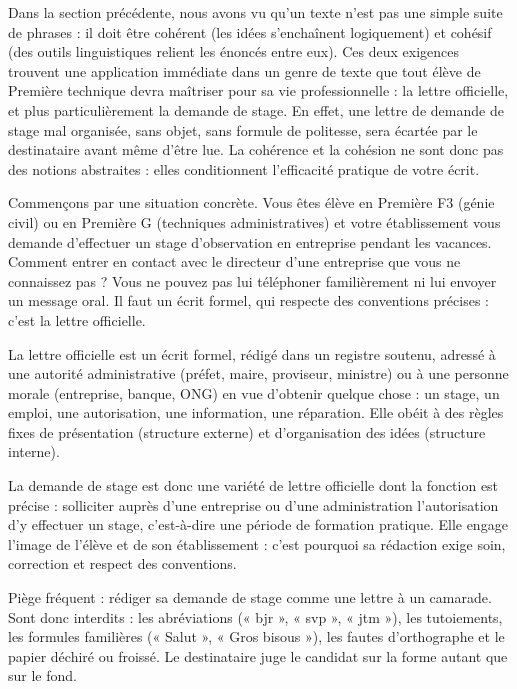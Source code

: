 \documentclass[11pt]{article}
\newcommand{\cle}[1]{{\popxbold\color{popdark}#1}}
\newcounter{popsec}
\newcounter{popsub}
\newcommand{\courssub}[1]{%
  \stepcounter{popsub}%
  \par\vspace{9pt}\noindent{\popxbold\fontsize{11.5}{13}\selectfont\color{popink}{\color{poporange}\thepopsec.\thepopsub}\hspace{6pt}#1}\par\nopagebreak\vspace{4pt}
}
\begin{document}
Dans la section précédente, nous avons vu qu'un texte n'est pas une simple suite de phrases : il doit être \cle{cohérent} (les idées s'enchaînent logiquement) et \cle{cohésif} (des outils linguistiques relient les énoncés entre eux). Ces deux exigences trouvent une application immédiate dans un genre de texte que tout élève de Première technique devra maîtriser pour sa vie professionnelle : la \cle{lettre officielle}, et plus particulièrement la \cle{demande de stage}. En effet, une lettre de demande de stage mal organisée, sans objet, sans formule de politesse, sera écartée par le destinataire avant même d'être lue. La cohérence et la cohésion ne sont donc pas des notions abstraites : elles conditionnent l'efficacité pratique de votre écrit.

\courssub{Nature et fonction de la lettre officielle}

Commençons par une situation concrète. Vous êtes élève en Première F3 (génie civil) ou en Première G (techniques administratives) et votre établissement vous demande d'effectuer un stage d'observation en entreprise pendant les vacances. Comment entrer en contact avec le directeur d'une entreprise que vous ne connaissez pas ? Vous ne pouvez pas lui téléphoner familièrement ni lui envoyer un message oral. Il faut un écrit \cle{formel}, qui respecte des conventions précises : c'est la lettre officielle.

\begin{definition}
La \cle{lettre officielle} est un écrit formel, rédigé dans un \cle{registre soutenu}, adressé à une autorité administrative (préfet, maire, proviseur, ministre) ou à une personne morale (entreprise, banque, ONG) en vue d'obtenir quelque chose : un stage, un emploi, une autorisation, une information, une réparation. Elle obéit à des règles fixes de présentation (structure externe) et d'organisation des idées (structure interne).
\end{definition}

La \cle{demande de stage} est donc une variété de lettre officielle dont la fonction est précise : solliciter auprès d'une entreprise ou d'une administration l'autorisation d'y effectuer un stage, c'est-à-dire une période de formation pratique. Elle engage l'image de l'élève et de son établissement : c'est pourquoi sa rédaction exige soin, correction et respect des conventions.

\begin{attention}
Piège fréquent : rédiger sa demande de stage comme une lettre à un camarade. Sont donc interdits : les abréviations (« bjr », « svp », « jtm »), les tutoiements, les formules familières (« Salut », « Gros bisous »), les fautes d'orthographe et le papier déchiré ou froissé. Le destinataire juge le candidat sur la forme autant que sur le fond.
\end{attention}
\end{document}
